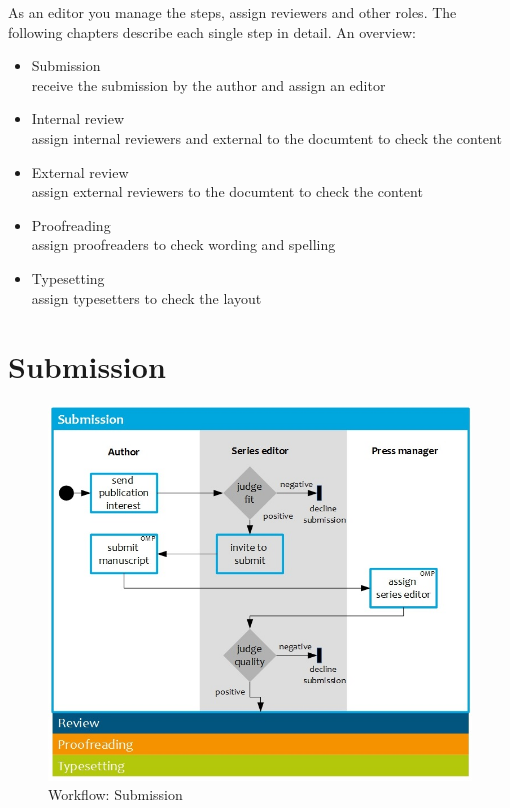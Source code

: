 As an editor you manage the steps, assign reviewers and other roles. The following chapters describe each single step in detail. An overview:

\begin{itemize}
\item Submission \\receive the submission by the author and assign an editor
\item Internal review \\assign internal reviewers and external to the documtent to check the content 
\item External review \\assign external reviewers to the documtent to check the content
\item Proofreading \\assign proofreaders to check wording and spelling
\item Typesetting \\assign typesetters to check the layout
\end{itemize}



\section{Submission}

\begin{figure}[h] \centering
\includegraphics[width=1\textwidth]{./img/workflow_submission.jpg} \caption{Workflow: Submission}
\label{fig:workflowSubmission}
\end{figure}

